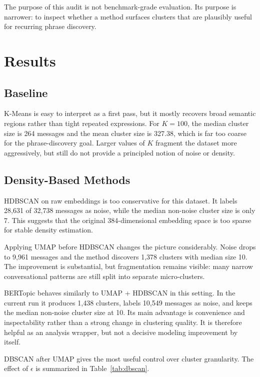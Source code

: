 \documentclass{bmvc2k}
\begin{document}
The purpose of this audit is not benchmark-grade evaluation. Its purpose is narrower: to inspect whether a method surfaces clusters that are plausibly useful for recurring phrase discovery.

\section{Results}

\subsection{Baseline}

K-Means is easy to interpret as a first pass, but it mostly recovers broad semantic regions rather than tight repeated expressions. For $K=100$, the median cluster size is 264 messages and the mean cluster size is 327.38, which is far too coarse for the phrase-discovery goal. Larger values of $K$ fragment the dataset more aggressively, but still do not provide a principled notion of noise or density.

\subsection{Density-Based Methods}

HDBSCAN on raw embeddings is too conservative for this dataset. It labels 28{,}631 of 32{,}738 messages as noise, while the median non-noise cluster size is only 7. This suggests that the original 384-dimensional embedding space is too sparse for stable density estimation.

Applying UMAP before HDBSCAN changes the picture considerably. Noise drops to 9{,}961 messages and the method discovers 1{,}378 clusters with median size 10. The improvement is substantial, but fragmentation remains visible: many narrow conversational patterns are still split into separate micro-clusters.

BERTopic behaves similarly to UMAP + HDBSCAN in this setting. In the current run it produces 1{,}438 clusters, labels 10{,}549 messages as noise, and keeps the median non-noise cluster size at 10. Its main advantage is convenience and inspectability rather than a strong change in clustering quality. It is therefore helpful as an analysis wrapper, but not a decisive modeling improvement by itself.

DBSCAN after UMAP gives the most useful control over cluster granularity. The effect of $\epsilon$ is summarized in Table~\ref{tab:dbscan}.
\end{document}
